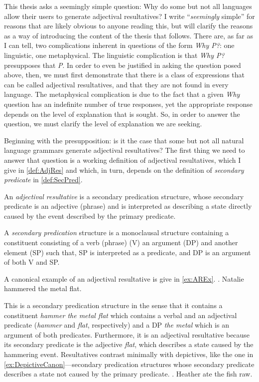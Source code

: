 \documentclass[MilwayThesis]{subfiles}
\begin{document}
This thesis asks a seemingly simple question: Why do some but not all languages allow their users to generate adjectival resultatives?
I write ``\textit{seemingly} simple'' for reasons that are likely obvious to anyone reading this, but will clarify the reasons as a way of introducing the content of the thesis that follows.
There are, as far as I can tell, two complications inherent in questions of the form \textit{Why P?}: one linguistic, one metaphysical.
The linguistic complication is that \textit{Why P?} presupposes that \textit{P}.
In order to even be justified in asking the question posed above, then, we must first demonstrate that there is a class of expressions that can be called adjectival resultatives, and that they are not found in every language.
The metaphysical complication is due to the fact that a given \textit{Why} question has an indefinite number of true responses, yet the appropriate response depends on the level of explanation that is sought.
So, in order to answer the question, we must clarify the level of explanation we are seeking.

Beginning with the presupposition: is it the case that some but not all natural language grammars generate adjectival resultatives?
The first thing we need to answer that question is a working definition of adjectival resultatives, which I give in \cref{def:AdjRes} and which, in turn, depends on the definition of \textit{secondary predicate} in \cref{def:SecPred}.
\begin{defn}\label{def:AdjRes}
	An \textit{adjectival resultative} is a secondary predication structure, whose secondary predicate is an adjective (phrase) and is interpreted as describing a state directly caused by the event described by the primary predicate.
\end{defn}
\begin{defn}\label{def:SecPred}
	A \textit{secondary predication} structure is a monoclausal structure containing a constituent consisting of a verb (phrase) (V) an argument (DP) and another element (SP) such that, SP is interpreted as a predicate, and DP is an argument of both V and SP.
\end{defn}

A canonical example of an adjectival resultative is give in \cref{ex:AREx}.
\ex. \label{ex:AREx} Natalie hammered the metal flat.

This is a secondary predication structure in the sense that it contains a constituent \textit{hammer the metal flat} which contains a verbal and an adjectival predicate (\textit{hammer} and \textit{flat}, respectively) and a DP \textit{the metal} which is an argument of both predicates.
Furthermore, it is an adjectival resultative because its secondary predicate is the adjective \textit{flat}, which describes a state caused by the hammering event.
Resultatives contrast minimally with depictives, like the one in \cref{ex:DepictiveCanon}---secondary predication structures whose secondary predicate describes a state not caused by the primary predicate.
\ex.\label{ex:DepictiveCanon} Heather ate the fish raw.
\end{document}
